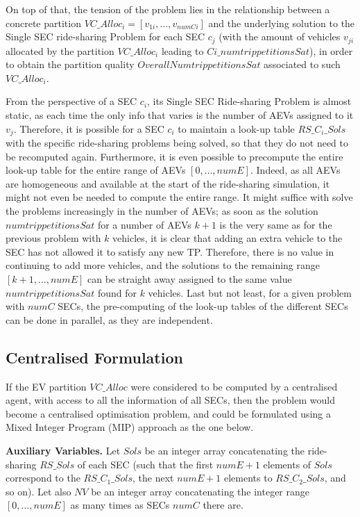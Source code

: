 On top of that, the tension of the problem lies in the relationship between a concrete partition
$VC\_Alloc_i = [ v_{1i}, \ldots, v_{numCi} ]$
and the underlying solution to the Single SEC ride-sharing Problem for each SEC $c_j$ (with the amount of vehicles $v_{ji}$
allocated by the partition $VC\_Alloc_i$ leading to $Ci\_numtrip petitionsSat$), in order to obtain the partition quality $OverallNumtrip petitionsSat$
associated to such $VC\_Alloc_i$.

From the perspective of a SEC $c_i$, its Single SEC Ride-sharing Problem is almost static,
as each time the only info that varies is the number of AEVs assigned to it $v_j$.
Therefore, it is possible for a SEC $c_i$ to maintain a look-up table $RS\_C_i\_Sols$ with the specific
ride-sharing problems being solved, so that they do not need to be recomputed again.
Furthermore, it is even possible to precompute the entire look-up table
for the entire range of AEVs $[0, \ldots, numE]$. Indeed, as all AEVs are homogeneous and available at the start of the
ride-sharing simulation, it might not even be needed to compute the entire range.
It might suffice with solve the problems increasingly in the number of AEVs;
as soon as the solution $numtrip petitionsSat$ for a number of AEVs $k+1$ is the very same as for the previous problem with $k$
vehicles, it is clear that adding an extra vehicle to the SEC has not allowed it to satisfy any new TP.
Therefore, there is no value in continuing to add more vehicles, and the solutions to the remaining range
$[k+1, \ldots, numE]$ can be straight away assigned to the same value $numtrip petitionsSat$ found for $k$ vehicles.
Last but not least, for a given problem with $numC$ SECs, the pre-computing of the look-up tables of
the different SECs can be done in parallel, as they are independent.

\subsection{Centralised Formulation}
\label{ccis_centralised_formulation}

If the EV partition $VC\_Alloc$ were considered to be computed by a centralised agent, with access to
all the information of all SECs, then the problem would become a centralised optimisation problem,
and could be formulated using a Mixed Integer Program (MIP) approach as the one below.

\textbf{Auxiliary Variables.} Let $Sols$ be an integer array concatenating the ride-sharing $RS\_Sols$ of each
SEC (such that the first $numE + 1$ elements of $Sols$ correspond to the $RS\_C_1\_Sols$,
the next $numE + 1$ elements to $RS\_C_2\_Sols$, and so on). Let also $NV$ be an integer array
concatenating the integer range $[0, \ldots, numE]$ as many times as SECs $numC$ there are.

